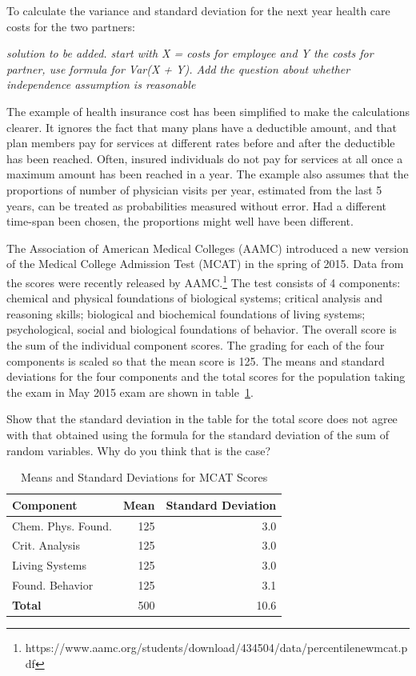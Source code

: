 To calculate the variance and standard deviation for the next year health care costs for the two partners:

\textit{solution to be added.  start with X = costs for employee and Y the costs for partner, use formula for Var(X + Y). Add the question about whether independence assumption is reasonable}

The example of health insurance cost has been simplified to make the calculations clearer.  It ignores the fact that many plans have a deductible amount, and that plan members pay for services at different rates before and after the deductible has been reached. Often, insured individuals do not pay for services at all once a maximum amount has been reached in a year. The example also assumes that the proportions of number of physician visits per year, estimated from the last 5 years, can be treated as probabilities measured without error.  Had a different time-span been chosen, the proportions might well have been different.  

\begin{exercise}  The Association of American Medical Colleges (AAMC) introduced a new version of the Medical College Admission Test (MCAT) in the spring of 2015. Data from the scores were recently released by AAMC.\footnote{https://www.aamc.org/students/download/434504/data/percentilenewmcat.pdf}  The test consists of 4 components: chemical and physical foundations of biological systems; critical analysis and reasoning skills; biological and biochemical foundations of living systems; psychological, social and biological foundations of behavior. The overall score is the sum of the individual component scores. The grading for each of the four components is scaled so that the mean score is 125.  The means and standard deviations for the four components and the total scores for the population taking the exam in May 2015 exam are shown in table~\ref{table:mcatScoreDistribution}.
	
Show that the standard deviation in the table for the total score does not agree with that obtained using the formula for the standard deviation of the sum of random variables.  Why do you think that is the case?

	\begin{table}[h]
		\centering
		\begin{tabular}{lrr}
			\hline
			\textbf{Component} & \textbf{Mean} & \textbf{Standard Deviation}\\
			\hline
			             Chem. Phys. Found. &   125 &   3.0\\
			             Crit. Analysis &   125 &    3.0 \\
			             Living  Systems &  125 &     3.0\\
			             Found. Behavior&   125 &     3.1\\
			             \textbf{Total} &    500 &     10.6\\
			\hline
		\end{tabular}
		\caption{Means and Standard Deviations for MCAT Scores}
		\label{table:mcatScoreDistribution}
	\end{table}	
\end{exercise}


